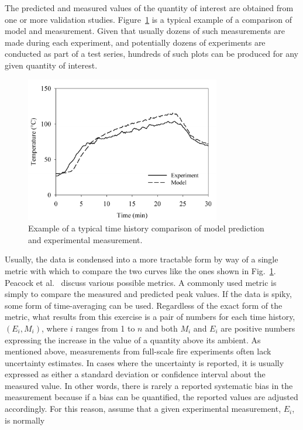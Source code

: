 The predicted and measured values of the quantity of interest are obtained from one or more validation studies.
Figure~\ref{temp_history} is a typical example of a comparison of model and measurement. Given that usually
dozens of such measurements are made during each experiment,
and potentially dozens of experiments are conducted as part of a test series, hundreds of such plots can be
produced for any given quantity of interest.
\begin{figure}[ht]
\begin{center}
\includegraphics[height=2.5in]{FIGURES/sample_time_history}
\end{center}
\caption[Sample time history plots.]{Example of a typical time history comparison of model prediction and experimental measurement.}
\label{temp_history}
\end{figure}
Usually, the data is condensed into a more tractable form by way of a single metric with which to
compare the two curves like the ones shown in Fig.~\ref{temp_history}. Peacock et al.~\cite{Peacock:FSJ1999}
discuss various possible metrics. A commonly used metric is simply to compare the measured and predicted peak values.
If the data is spiky, some form of time-averaging can be used. Regardless of the exact form of the metric, what results from
this exercise is a pair of numbers for each time history, $(E_i,M_i)$, where $i$ ranges from 1 to $n$ and both $M_i$ and $E_i$ are positive numbers
expressing the increase in the value of a quantity above its ambient.
As mentioned above, measurements from full-scale fire experiments often lack uncertainty estimates. In cases where the uncertainty is
reported, it is usually expressed as either a standard deviation or confidence interval about the measured value. In other words, there is rarely
a reported systematic bias in the measurement because if a bias can be quantified, the reported values are adjusted accordingly.
For this reason, assume that a given experimental measurement, $E_i$, is normally
